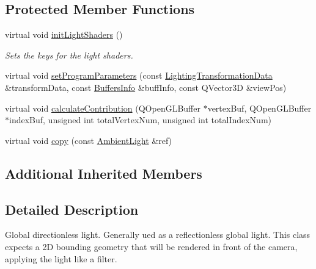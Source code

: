 \subsection*{Protected Member Functions}
\begin{DoxyCompactItemize}
\item 
\mbox{\label{class_geometry_engine_1_1_geometry_world_item_1_1_geometry_light_1_1_ambient_light_a0d27aaf4867e35c545f572ff2cf8c251}} 
virtual void \mbox{\hyperlink{class_geometry_engine_1_1_geometry_world_item_1_1_geometry_light_1_1_ambient_light_a0d27aaf4867e35c545f572ff2cf8c251}{init\+Light\+Shaders}} ()
\begin{DoxyCompactList}\small\item\em Sets the keys for the light shaders. \end{DoxyCompactList}\item 
virtual void \mbox{\hyperlink{class_geometry_engine_1_1_geometry_world_item_1_1_geometry_light_1_1_ambient_light_a1ba7a81ad6ccc571ec831892a5434734}{set\+Program\+Parameters}} (const \mbox{\hyperlink{class_geometry_engine_1_1_lighting_transformation_data}{Lighting\+Transformation\+Data}} \&transform\+Data, const \mbox{\hyperlink{class_geometry_engine_1_1_buffers_info}{Buffers\+Info}} \&buff\+Info, const Q\+Vector3D \&view\+Pos)
\item 
virtual void \mbox{\hyperlink{class_geometry_engine_1_1_geometry_world_item_1_1_geometry_light_1_1_ambient_light_a4f1d4fb9ad25626e15c28de03b610b4f}{calculate\+Contribution}} (Q\+Open\+G\+L\+Buffer $\ast$vertex\+Buf, Q\+Open\+G\+L\+Buffer $\ast$index\+Buf, unsigned int total\+Vertex\+Num, unsigned int total\+Index\+Num)
\item 
virtual void \mbox{\hyperlink{class_geometry_engine_1_1_geometry_world_item_1_1_geometry_light_1_1_ambient_light_a1c70ea9fb43e4242ef93ffd154304988}{copy}} (const \mbox{\hyperlink{class_geometry_engine_1_1_geometry_world_item_1_1_geometry_light_1_1_ambient_light}{Ambient\+Light}} \&ref)
\end{DoxyCompactItemize}
\subsection*{Additional Inherited Members}


\subsection{Detailed Description}
Global directionless light. Generally ued as a reflectionless global light. This class expects a 2D bounding geometry that will be rendered in front of the camera, applying the light like a filter. 

